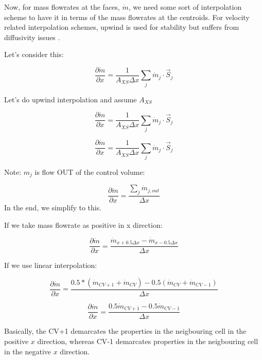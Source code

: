 \documentclass[masters]{ucbthesis}
\renewcommand{\_}{\kern-1.5pt\textunderscore\kern-1.5pt}
\begin{document}
Now, for mass flowrates at the faces, $\dot{m}$, we need some sort 
of interpolation scheme to have it in terms of the mass flowrates at 
the centroids. For velocity related interpolation schemes, upwind is used 
for stability but suffers from diffusivity issues 
\citep{alves2003convergent}.

Let's consider this:

\begin{equation*}
	\frac{\partial \dot{m}}{\partial x}  
	= \frac{1}{A_{XS} \Delta x}  \sum_j \dot{m}_j \cdot \vec{S}_j
\end{equation*}

Let's do upwind interpolation and assume $A_{XS}$

\begin{equation*}
	\frac{\partial \dot{m}}{\partial x}  
	= \frac{1}{A_{XS} \Delta x}  \sum_j \dot{m}_j \cdot \vec{S}_j
\end{equation*}


\begin{equation*}
	\frac{\partial \dot{m}}{\partial x}  
	= \frac{1}{A_{XS} \Delta x}  \sum_j \dot{m}_j \cdot \vec{S}_j
\end{equation*}

Note: $m_j$ is flow OUT of the control volume:


\begin{equation*}
	\frac{\partial \dot{m}}{\partial x}  
	= \frac{\sum_j \dot{m}_{j,out}}{\Delta x}  
\end{equation*}
In the end, we simplify to this.

If we take mass flowrate as positive in x direction:

\begin{equation*}
	\frac{\partial \dot{m}}{\partial x}  
	= \frac{\dot{m}_{x+0.5 \Delta x} - \dot{m}_{x-0.5 \Delta x}}{\Delta x}  
\end{equation*}

If we use linear interpolation:


\begin{equation*}
	\frac{\partial \dot{m}}{\partial x}  
	= \frac{0.5*(\dot{m}_{CV+1}+\dot{m}_{CV}) - 0.5(\dot{m}_{CV}+\dot{m}_{CV-1})}{\Delta x}  
\end{equation*}

\begin{equation*}
	\frac{\partial \dot{m}}{\partial x}  
	= \frac{0.5\dot{m}_{CV+1} - 0.5\dot{m}_{CV-1}}{\Delta x}  
\end{equation*}

Basically, the CV+1 demarcates the properties in the neigbouring cell in 
the positive $x$ direction, whereas CV-1 demarcates properties in the 
neigbouring cell in the negative $x$ direction.
\end{document}
